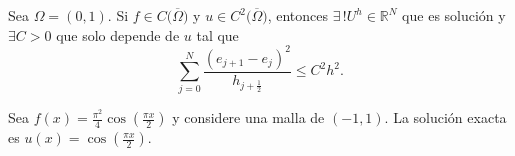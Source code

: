 \begin{frame}
	\begin{theorem}[]
		Sea $\Omega=\left(0,1\right)$.
		Si $f\in C\big(\overline{\Omega}\big)$ y
		$u\in C^{2}\big(\overline{\Omega}\big)$, entonces
		$\exists\,!U^{h}\in\mathbb{R}^{N}$ que es solución
		y $\exists C>0$ que solo depende de $u$ tal que
		\begin{equation*}
			\sum_{j=0}^{N}
			\frac{\left(e_{j+1}-e_{j}\right)^{2}}{h_{j+\frac{1}{2}}}\leq
			C^{2}h^{2}.
		\end{equation*}
	\end{theorem}

	\begin{example}
		Sea
		\begin{math}
			f\left(x\right)=
			\frac{\pi^{2}}{4}
			\cos\left(\frac{\pi x}{2}\right)
		\end{math}
		y considere una malla de $\left(-1,1\right)$.
		La solución exacta es
		\begin{math}
			u\left(x\right)=
			\cos\left(\frac{\pi x}{2}\right)
		\end{math}.
	\end{example}
\end{frame}
